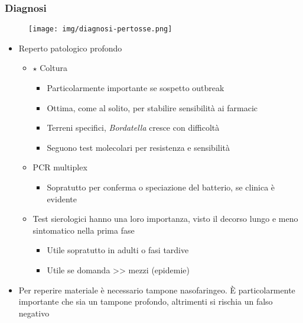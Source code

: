 \documentclass[italian,]{article}
\providecommand{\tightlist}{%
  \setlength{\itemsep}{0pt}\setlength{\parskip}{0pt}}
\newcommand{\goldstandard}{\textcircled{$\star$} }                      %
\begin{document}
\hypertarget{diagnosi-7}{%
\subsubsection{Diagnosi}\label{diagnosi-7}}

\begin{figure}[H]
\centering
    \texttt{[image: img/diagnosi-pertosse.png]}
\end{figure}

\begin{itemize}
\tightlist
\item
  Reperto patologico profondo

  \begin{itemize}
  \tightlist
  \item
    \goldstandard Coltura

    \begin{itemize}
    \tightlist
    \item
      Particolarmente importante se sospetto outbreak
    \item
      Ottima, come al solito, per stabilire sensibilità ai farmacic
    \item
      Terreni specifici, \emph{Bordatella} cresce con difficoltà
    \item
      Seguono test molecolari per resistenza e sensibilità
    \end{itemize}
  \item
    PCR multiplex

    \begin{itemize}
    \tightlist
    \item
      Sopratutto per conferma o speciazione del batterio, se clinica è
      evidente
    \end{itemize}
  \item
    Test sierologici hanno una loro importanza, visto il decorso lungo e
    meno sintomatico nella prima fase

    \begin{itemize}
    \tightlist
    \item
      Utile sopratutto in adulti o fasi tardive
    \item
      Utile se domanda \textgreater{}\textgreater{} mezzi (epidemie)
    \end{itemize}
  \end{itemize}
\item
  Per reperire materiale è necessario tampone nasofaringeo. È
  particolarmente importante che sia un tampone profondo, altrimenti si
  rischia un falso negativo
\end{itemize}
\end{document}
